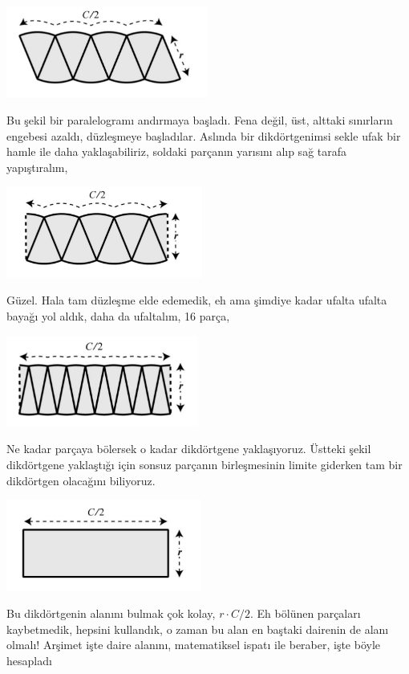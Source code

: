 \documentclass[12pt,fleqn]{article}\usepackage{../../common}
\begin{document}
\includegraphics[height=3cm]{circ_4.png}

Bu şekil bir paralelogramı andırmaya başladı. Fena değil, üst, alttaki
sınırların engebesi azaldı, düzleşmeye başladılar. Aslında bir
dikdörtgenimsi sekle ufak bir hamle ile daha yaklaşabiliriz, soldaki
parçanın yarısını alıp sağ tarafa yapıştıralım,

\includegraphics[height=3cm]{circ_5.png}

Güzel. Hala tam düzleşme elde edemedik, eh ama şimdiye kadar ufalta ufalta
bayağı yol aldık, daha da ufaltalım, 16 parça,

\includegraphics[height=3cm]{circ_6.png}

Ne kadar parçaya bölersek o kadar dikdörtgene yaklaşıyoruz. Üstteki şekil
dikdörtgene yaklaştığı için sonsuz parçanın birleşmesinin limite giderken
tam bir dikdörtgen olacağını biliyoruz. 

\includegraphics[height=3cm]{circ_7.png}

Bu dikdörtgenin alanını bulmak çok kolay, $r \cdot C/2$. Eh bölünen parçaları
kaybetmedik, hepsini kullandık, o zaman bu alan en baştaki dairenin de alanı
olmalı! Arşimet işte daire alanını, matematiksel ispatı ile beraber, işte böyle
hesapladı
\end{document}
